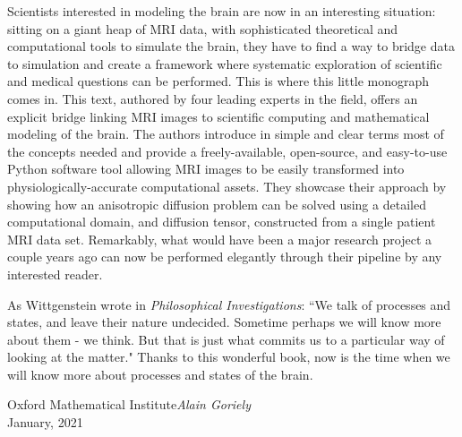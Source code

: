 Scientists interested in modeling the brain are now in an interesting
situation: sitting on a giant heap of MRI data, with sophisticated
theoretical and computational tools to simulate the brain, they have
to find a way to bridge data to simulation and create a framework
where systematic exploration of scientific and medical questions can
be performed. This is where this little monograph comes in.  This
text, authored by four leading experts in the field, offers an
explicit bridge linking MRI images to scientific computing and
mathematical modeling of the brain.  The authors introduce in simple
and clear terms most of the concepts needed and provide a
freely-available, open-source, and easy-to-use Python software tool
allowing MRI images to be easily transformed into
physiologically-accurate computational assets.  They showcase their
approach by showing how an anisotropic diffusion problem can be solved
using a detailed computational domain, and diffusion tensor,
constructed from a single patient MRI data set. Remarkably, what would
have been a major research project a couple years ago can now be
performed elegantly through their pipeline by any interested reader.

As Wittgenstein wrote in \textit{Philosophical Investigations}: ``We
talk of processes and states, and leave their nature
undecided. Sometime perhaps we will know more about them - we
think. But that is just what commits us to a particular way of looking
at the matter." Thanks to this wonderful book, now is the time when we
will know more about processes and states of the brain.


\vspace{\baselineskip}
\begin{flushright}\noindent
Oxford Mathematical Institute\hfill {\it Alain Goriely}\\
January, 2021\hfill $\,$ \\ 
\end{flushright}
